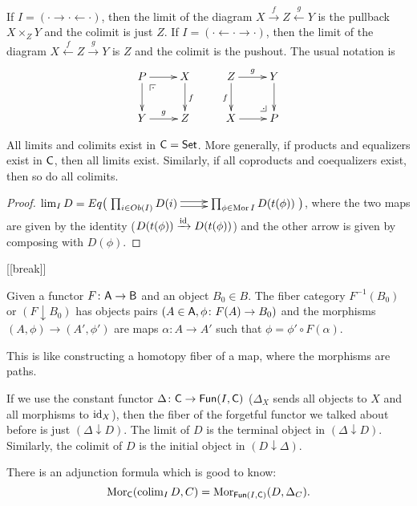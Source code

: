 \begin{example}
 If $I=(\cdot\to \cdot\leftarrow \cdot)$, then the limit of the diagram $X\xrightarrow f Z\xleftarrow g Y$ is the pullback $X\times_Z Y$ and the colimit is just $Z$. If $I=(\cdot\leftarrow \cdot \to \cdot)$, then the limit of the diagram $X\xleftarrow f Z\xrightarrow g Y$ is $Z$ and the colimit is the pushout. The usual notation is
 \[\xymatrix{
  P\ar[r]\ar[d]\ar@{}[dr]|(.25)\pb & X\ar[d]^f\\
  Y\ar[r]^g &Z
 }\qquad
 \xymatrix{
 Z\ar[r]^g \ar[d]_f \ar@{}[dr]|(.75)\po & Y\ar[d]\\
 X\ar[r] & P
 }\qedhere\]
\end{example}
\begin{lemma}
 All limits and colimits exist in $\text{\sf C}=\operatorname{\sf Set}$. More generally, if products and equalizers exist in $\text{\sf C}$, then all limits exist. Similarly, if all coproducts and coequalizers exist, then so do all colimits.
\end{lemma}
\begin{proof}
$\lim_I D = Eq\bigl(\xymatrix{ \prod_{i\in Ob(I)} D(i)\ar@<.5ex>[r]\ar@<-.5ex>[r] & \prod_{\phi\in \mor I} D(t(\phi)) }\bigr)$, where the two maps are given by the identity ($D(t(\phi))\xrightarrow{\operatorname{id}} D(t(\phi))$) and the other arrow is given by composing with $D(\phi)$.
\end{proof}

[[break]]
 
\begin{definition}
 Given a functor $F\colon \text{\sf A}\to \text{\sf B}$ and an object $B_0\in B$. The fiber category $F^{-1}(B_0)$ or $(F\downarrow B_0)$ has objects pairs $(A\in \text{\sf A}, \phi\colon F(A)\to B_0)$ and the morphisms $(A,\phi)\to (A',\phi')$ are maps $\alpha\colon A\to A'$ such that $\phi = \phi'\circ F(\alpha)$.
\end{definition}
This is like constructing a homotopy fiber of a map, where the morphisms are paths.

If we use the constant functor $\Delta\colon \text{\sf C}\to \text{\sf Fun}(I,\text{\sf C})$ ($\Delta_X$ sends all objects to $X$ and all morphisms to $\operatorname{id}_X$), then the fiber of the forgetful functor we talked about before is just $(\Delta\downarrow D)$. The limit of $D$ is the terminal object in $(\Delta\downarrow D)$. Similarly, the colimit of $D$ is the initial object in $(D\downarrow \Delta)$.

There is an adjunction formula which is good to know:
\[
 \operatorname{Mor}_{\text{\sf C}}(\operatorname{colim}_I D,C) = \operatorname{Mor}_{\text{\sf Fun}(I,\text{\sf C})}(D,\Delta_C).
\]

